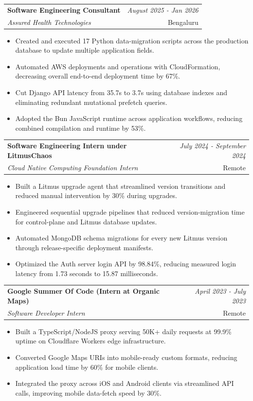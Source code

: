 \documentclass[a4paper,11pt]{article}
\makeatletter
\newcommand{\resumeSubheading}[4]{
\vspace{0.5mm}\item
    \begin{tabular*}{0.98\textwidth}[t]{l@{\extracolsep{\fill}}r}
        \textbf{#1} & \textit{\footnotesize{#4}} \\
        \textit{\footnotesize{#3}} &  \footnotesize{#2}\\
    \end{tabular*}
    \vspace{-2.4mm}
}
\newcommand{\resumeItemListStart}{\begin{justify}\begin{itemize}[leftmargin=3ex, rightmargin=2ex, noitemsep,labelsep=1.2mm,itemsep=0mm]\small}
\newcommand{\resumeItemListEnd}{\end{itemize}\end{justify}\vspace{-2mm}}
\makeatother
\begin{document}
\vspace{-2mm}
\resumeSubheading
{ Software Engineering Consultant}{Bengaluru}
{Assured Health Technologies}{August 2025 - Jan 2026}
\resumeItemListStart
\item {Created and executed 17 Python data-migration scripts across the production database to update multiple application fields.}
\item {Automated AWS deployments and operations with CloudFormation, decreasing overall end-to-end deployment time by 67\%.}
\item {Cut Django API latency from 35.7s to 3.7s using database indexes and eliminating redundant mutational prefetch queries.}
\item {Adopted the Bun JavaScript runtime across application workflows, reducing combined compilation and runtime by 53\%.}
\resumeItemListEnd

\vspace{-2mm}
\resumeSubheading
{ Software Engineering Intern under LitmusChaos}{Remote}
{Cloud Native Computing Foundation Intern}{July 2024 - September 2024}
\resumeItemListStart
\item {Built a Litmus upgrade agent that streamlined version transitions and reduced manual intervention by 30\% during upgrades.}
\item {Engineered sequential upgrade pipelines that reduced version-migration time for control-plane and Litmus database updates.}
\item {Automated MongoDB schema migrations for every new Litmus version through release-specific deployment manifests.}
\item {Optimized the Auth server login API by 98.84\%, reducing measured login latency from 1.73 seconds to 15.87 milliseconds.}
\resumeItemListEnd


\vspace{-2.0mm}

\resumeSubheading
{ Google Summer Of Code (Intern at Organic Maps)}{Remote}
{Software Developer Intern}{April 2023 - July 2023}
\resumeItemListStart
\item {Built a TypeScript/NodeJS proxy serving 50K+ daily requests at 99.9\% uptime on Cloudflare Workers edge infrastructure.}
\item {Converted Google Maps URIs into mobile-ready custom formats, reducing application load time by 60\% for mobile clients.}
\item {Integrated the proxy across iOS and Android clients via streamlined API calls, improving mobile data-fetch speed by 30\%.}
\resumeItemListEnd
    
\end{document}
